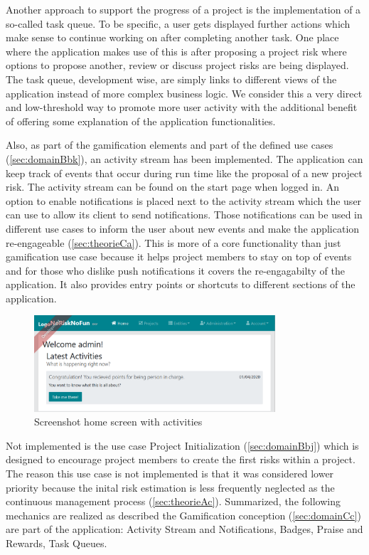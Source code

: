 Another approach to support the progress of a project is the implementation of a so-called task queue. To be specific, a user gets displayed further actions which make sense to continue working on after completing another task. One place where the application makes use of this is after proposing a project risk where options to propose another, review or discuss project risks are being displayed. The task queue, development wise, are simply links to different views of the application instead of more complex business logic. We consider this a very direct and low-threshold way to promote more user activity with the additional benefit of offering some explanation of the application functionalities.

Also, as part of the gamification elements and part of the defined use cases (\ref{sec:domainBbk}), an activity stream has been implemented. The application can keep track of events that occur during run time like the proposal of a new project risk. The activity stream can be found on the start page when logged in. An option to enable notifications is placed next to the activity stream which the user can use to allow its client to send notifications. Those notifications can be used in different use cases to inform the user about new events and make the application re-engageable (\ref{sec:theorieCa}). This is more of a core functionality than just gamification use case because it helps project members to stay on top of events and for those who dislike push notifications it covers the re-engagabilty of the application. It also provides entry points or shortcuts to different sections of the application.

\begin{figure}[H]
	\centering
	\includegraphics[width=0.8\textwidth]{Assets/implementation_shots/activitystream.png}
	\caption{Screenshot home screen with activities}
	\label{fig:activitystream}
\end{figure}

Not implemented is the use case Project Initialization (\ref{sec:domainBbj}) which is designed to encourage project members to create the first risks within a project. The reason this use case is not implemented is that it was considered lower priority because the inital risk estimation is less frequently neglected as the continuous management process (\ref{sec:theorieAc}).
Summarized, the following mechanics are realized as described the Gamification conception (\ref{sec:domainCc}) are part of the application: Activity Stream and Notifications, Badges, Praise and Rewards, Task Queues.